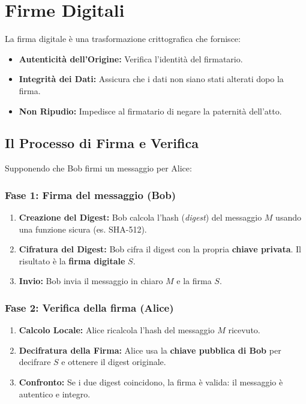 \section{Firme Digitali}

La firma digitale è una trasformazione crittografica che fornisce:
\begin{itemize}
    \item \textbf{Autenticità dell'Origine:} Verifica l'identità del firmatario.
    \item \textbf{Integrità dei Dati:} Assicura che i dati non siano stati alterati dopo la firma.
    \item \textbf{Non Ripudio:} Impedisce al firmatario di negare la paternità dell'atto.
\end{itemize}

\subsection{Il Processo di Firma e Verifica}
Supponendo che Bob firmi un messaggio per Alice:

\subsubsection{Fase 1: Firma del messaggio (Bob)}
\begin{enumerate}
    \item \textbf{Creazione del Digest:} Bob calcola l'hash (\textit{digest}) del messaggio $M$ usando una funzione sicura (es. SHA-512).
    \item \textbf{Cifratura del Digest:} Bob cifra il digest con la propria \textbf{chiave privata}. Il risultato è la \textbf{firma digitale} $S$.
    \item \textbf{Invio:} Bob invia il messaggio in chiaro $M$ e la firma $S$.
\end{enumerate}

\subsubsection{Fase 2: Verifica della firma (Alice)}
\begin{enumerate}
    \item \textbf{Calcolo Locale:} Alice ricalcola l'hash del messaggio $M$ ricevuto.
    \item \textbf{Decifratura della Firma:} Alice usa la \textbf{chiave pubblica di Bob} per decifrare $S$ e ottenere il digest originale.
    \item \textbf{Confronto:} Se i due digest coincidono, la firma è valida: il messaggio è autentico e integro.
\end{enumerate}

